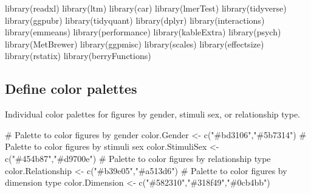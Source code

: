 \documentclass[
  bookmarksnumbered]{article}
\newenvironment{Shaded}{\begin{snugshade}}{\end{snugshade}}
\newcommand{\CommentTok}[1]{\textcolor[rgb]{0.50,0.62,0.50}{#1}}
\newcommand{\FunctionTok}[1]{\textcolor[rgb]{0.94,0.94,0.56}{#1}}
\newcommand{\NormalTok}[1]{\textcolor[rgb]{0.80,0.80,0.80}{#1}}
\newcommand{\OtherTok}[1]{\textcolor[rgb]{0.94,0.94,0.56}{#1}}
\newcommand{\StringTok}[1]{\textcolor[rgb]{0.80,0.58,0.58}{#1}}
\begin{document}
\begin{Shaded}
\begin{Highlighting}[]
\FunctionTok{library}\NormalTok{(readxl)}
\FunctionTok{library}\NormalTok{(ltm)}
\FunctionTok{library}\NormalTok{(car)}
\FunctionTok{library}\NormalTok{(lmerTest)}
\FunctionTok{library}\NormalTok{(tidyverse)}
\FunctionTok{library}\NormalTok{(ggpubr)}
\FunctionTok{library}\NormalTok{(tidyquant)}
\FunctionTok{library}\NormalTok{(dplyr)}
\FunctionTok{library}\NormalTok{(interactions)}
\FunctionTok{library}\NormalTok{(emmeans)}
\FunctionTok{library}\NormalTok{(performance)}
\FunctionTok{library}\NormalTok{(kableExtra)}
\FunctionTok{library}\NormalTok{(psych)}
\FunctionTok{library}\NormalTok{(MetBrewer)}
\FunctionTok{library}\NormalTok{(ggpmisc)}
\FunctionTok{library}\NormalTok{(scales)}
\FunctionTok{library}\NormalTok{(effectsize)}
\FunctionTok{library}\NormalTok{(rstatix)}
\FunctionTok{library}\NormalTok{(berryFunctions)}
\end{Highlighting}
\end{Shaded}

\hypertarget{define-color-palettes}{%
\subsection{Define color palettes}\label{define-color-palettes}}

Individual color palettes for figures by gender, stimuli sex, or relationship type.

\begin{Shaded}
\begin{Highlighting}[]
\CommentTok{\# Palette to color figures by gender}
\NormalTok{color.Gender }\OtherTok{\textless{}{-}} \FunctionTok{c}\NormalTok{(}\StringTok{"\#bd3106"}\NormalTok{,}\StringTok{"\#5b7314"}\NormalTok{)}
\CommentTok{\# Palette to color figures by stimuli sex}
\NormalTok{color.StimuliSex }\OtherTok{\textless{}{-}} \FunctionTok{c}\NormalTok{(}\StringTok{"\#454b87"}\NormalTok{,}\StringTok{"\#d9700e"}\NormalTok{)}
\CommentTok{\# Palette to color figures by relationship type}
\NormalTok{color.Relationship }\OtherTok{\textless{}{-}} \FunctionTok{c}\NormalTok{(}\StringTok{"\#b39e05"}\NormalTok{,}\StringTok{"\#a513d6"}\NormalTok{)}
\CommentTok{\# Palette to color figures by dimension type}
\NormalTok{color.Dimension }\OtherTok{\textless{}{-}} \FunctionTok{c}\NormalTok{(}\StringTok{"\#582310"}\NormalTok{,}\StringTok{"\#318f49"}\NormalTok{,}\StringTok{"\#0cb4bb"}\NormalTok{)}
\end{Highlighting}
\end{Shaded}
\end{document}
